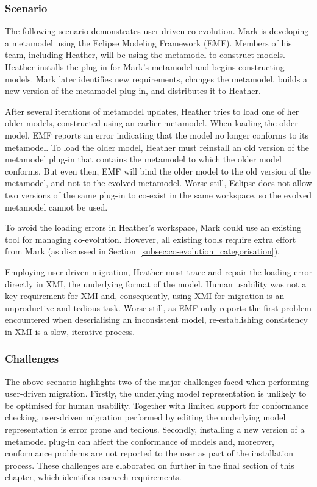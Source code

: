 \subsubsection{Scenario}
The following scenario demonstrates user-driven co-evolution. Mark is developing a metamodel using the Eclipse Modeling Framework (EMF). Members of his team, including Heather, will be using the metamodel to construct models. Heather installs the plug-in for Mark's metamodel and begins constructing models. Mark later identifies new requirements, changes the metamodel, builds a new version of the metamodel plug-in, and distributes it to Heather.

After several iterations of metamodel updates, Heather tries to load one of her older models, constructed using an earlier metamodel. When loading the older model, EMF reports an error indicating that the model no longer conforms to its metamodel. To load the older model, Heather must reinstall an old version of the metamodel plug-in that contains the metamodel to which the older model conforms. But even then, EMF will bind the older model to the old version of the metamodel, and not to the evolved metamodel. Worse still, Eclipse does not allow two versions of the same plug-in to co-exist in the same workspace, so the evolved metamodel cannot be used.

To avoid the loading errors in Heather's workspace, Mark could use an existing tool for managing co-evolution. However, all existing tools require extra effort from Mark (as discussed in Section~\ref{subsec:co-evolution_categorisation}).

Employing user-driven migration, Heather must trace and repair the loading error directly in XMI, the underlying format of the model. Human usability was not a key requirement for XMI \cite{hutn} and, consequently, using XMI for migration is an unproductive and tedious task. Worse still, as EMF only reports the first problem encountered when deserialising an inconsistent model, re-establishing consistency in XMI is a slow, iterative process.


\subsubsection{Challenges}
The above scenario highlights two of the major challenges faced when performing user-driven migration. Firstly, the underlying model representation is unlikely to be optimised for human usability. Together with limited support for conformance checking, user-driven migration performed by editing the underlying model representation is error prone and tedious. Secondly, installing a new version of a metamodel plug-in can affect the conformance of models and, moreover, conformance problems are not reported to the user as part of the installation process. These challenges are elaborated on further in the final section of this chapter, which identifies research requirements.


